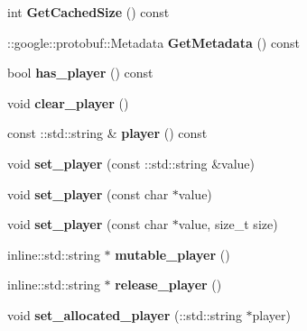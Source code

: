 \begin{DoxyCompactItemize}
\item 
\hypertarget{class_create_player_ab0f6a7f624e2a7f9228d9975338e43c7}{int {\bfseries Get\-Cached\-Size} () const }\label{class_create_player_ab0f6a7f624e2a7f9228d9975338e43c7}

\item 
\hypertarget{class_create_player_a11570983e86bd3a1633488d4e3a0f517}{\-::google\-::protobuf\-::\-Metadata {\bfseries Get\-Metadata} () const }\label{class_create_player_a11570983e86bd3a1633488d4e3a0f517}

\item 
\hypertarget{class_create_player_af2ffb8cd0a75402ad5fee111437d9a1a}{bool {\bfseries has\-\_\-player} () const }\label{class_create_player_af2ffb8cd0a75402ad5fee111437d9a1a}

\item 
\hypertarget{class_create_player_a4f321cb527a655d1552cbe4b1948ddaa}{void {\bfseries clear\-\_\-player} ()}\label{class_create_player_a4f321cb527a655d1552cbe4b1948ddaa}

\item 
\hypertarget{class_create_player_a83b1387aa31d0b45ac3869b751b622c2}{const \-::std\-::string \& {\bfseries player} () const }\label{class_create_player_a83b1387aa31d0b45ac3869b751b622c2}

\item 
\hypertarget{class_create_player_a2db7b5bdd9a904e95cf9f6e692629dcf}{void {\bfseries set\-\_\-player} (const \-::std\-::string \&value)}\label{class_create_player_a2db7b5bdd9a904e95cf9f6e692629dcf}

\item 
\hypertarget{class_create_player_a0b88b81aaae8fd710466fd0a01e6b822}{void {\bfseries set\-\_\-player} (const char $\ast$value)}\label{class_create_player_a0b88b81aaae8fd710466fd0a01e6b822}

\item 
\hypertarget{class_create_player_aefe31b783cb70940616878c601f36a45}{void {\bfseries set\-\_\-player} (const char $\ast$value, size\-\_\-t size)}\label{class_create_player_aefe31b783cb70940616878c601f36a45}

\item 
\hypertarget{class_create_player_a1a2f1ea62c2005e3a40e58a84970e86e}{inline\-::std\-::string $\ast$ {\bfseries mutable\-\_\-player} ()}\label{class_create_player_a1a2f1ea62c2005e3a40e58a84970e86e}

\item 
\hypertarget{class_create_player_a1b9edd8ec11c71202f139f21867d48f1}{inline\-::std\-::string $\ast$ {\bfseries release\-\_\-player} ()}\label{class_create_player_a1b9edd8ec11c71202f139f21867d48f1}

\item 
\hypertarget{class_create_player_ae7b000ed1c762919baee49272fe890f4}{void {\bfseries set\-\_\-allocated\-\_\-player} (\-::std\-::string $\ast$player)}\label{class_create_player_ae7b000ed1c762919baee49272fe890f4}

\end{DoxyCompactItemize}
